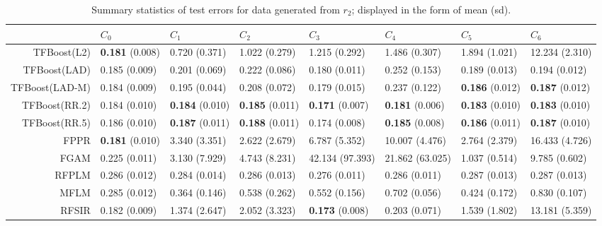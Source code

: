 \begin{table}[H]
\centering
\footnotesize
\begin{tabular}{rlllllll}
  \hline
 & $C_0$ & $C_1$ & $C_2$ & $C_3$ & $C_4$ & $C_5$ & $C_6$ \\ 
  \hline
TFBoost(L2) & \textbf{0.181} (0.008) & 0.720 (0.371) & 1.022 (0.279) & 1.215 (0.292) & 1.486 (0.307) & 1.894 (1.021) & 12.234 (2.310) \\ 
  TFBoost(LAD) & 0.185 (0.009) & 0.201 (0.069) & 0.222 (0.086) & 0.180 (0.011) & 0.252 (0.153) & 0.189 (0.013) & 0.194 (0.012) \\ 
  TFBoost(LAD-M) & 0.184 (0.009) & 0.195 (0.044) & 0.208 (0.072) & 0.179 (0.015) & 0.237 (0.122) & \textbf{0.186} (0.012) & \textbf{0.187} (0.012) \\ 
  TFBoost(RR.2) & 0.184 (0.010) & \textbf{0.184} (0.010) & \textbf{0.185} (0.011) & \textbf{0.171} (0.007) & \textbf{0.181} (0.006) & \textbf{0.183} (0.010) & \textbf{0.183} (0.010) \\ 
  TFBoost(RR.5) & 0.186 (0.010) & \textbf{0.187} (0.011) & \textbf{0.188} (0.011) & 0.174 (0.008) & \textbf{0.185} (0.008) & \textbf{0.186} (0.011) & \textbf{0.187} (0.010) \\ 
  FPPR & \textbf{0.181} (0.010) & 3.340 (3.351) & 2.622 (2.679) & 6.787 (5.352) & 10.007 (4.476) & 2.764 (2.379) & 16.433 (4.726) \\ 
  FGAM & 0.225 (0.011) & 3.130 (7.929) & 4.743 (8.231) & 42.134 (97.393) & 21.862 (63.025) & 1.037 (0.514) & 9.785 (0.602) \\ 
  RFPLM & 0.286 (0.012) & 0.284 (0.014) & 0.286 (0.013) & 0.276 (0.011) & 0.286 (0.011) & 0.287 (0.013) & 0.287 (0.013) \\ 
  MFLM & 0.285 (0.012) & 0.364 (0.146) & 0.538 (0.262) & 0.552 (0.156) & 0.702 (0.056) & 0.424 (0.172) & 0.830 (0.107) \\ 
  RFSIR & 0.182 (0.009) & 1.374 (2.647) & 2.052 (3.323) & \textbf{0.173} (0.008) & 0.203 (0.071) & 1.539 (1.802) & 13.181 (5.359) \\ 
   \hline
\end{tabular}
\caption{Summary statistics of test errors for data generated from $r_2$; displayed in the form of mean (sd).} 
\end{table}
